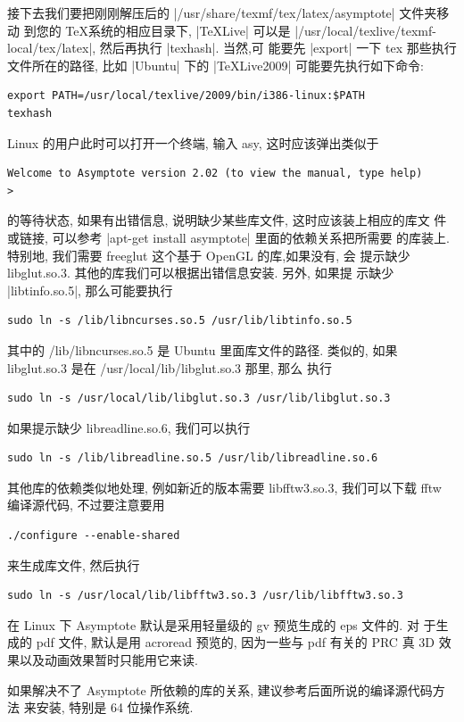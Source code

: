 \documentclass[nofonts,CJKnormalspaces]{ctexbook}[2009/05/20]
\begin{document}
接下去我们要把刚刚解压后的 |/usr/share/texmf/tex/latex/asymptote| 文件夹移动
到您的 \TeX 系统的相应目录下, |TeXLive| 可以是
|/usr/local/texlive/texmf-local/tex/latex|, 然后再执行 |texhash|. 当然,可
能要先 |export| 一下 tex 那些执行文件所在的路径, 比如 |Ubuntu| 下的
|TeXLive2009| 可能要先执行如下命令:
\begin{verbatim}
export PATH=/usr/local/texlive/2009/bin/i386-linux:$PATH
texhash
\end{verbatim}
Linux 的用户此时可以打开一个终端, 输入 asy, 这时应该弹出类似于
\begin{verbatim}
Welcome to Asymptote version 2.02 (to view the manual, type help)
>
\end{verbatim}
的等待状态, 如果有出错信息, 说明缺少某些库文件, 这时应该装上相应的库文
件或链接, 可以参考 |apt-get install asymptote| 里面的依赖关系把所需要
的库装上. 特别地, 我们需要 freeglut 这个基于 OpenGL 的库,如果没有, 会
提示缺少 libglut.so.3. 其他的库我们可以根据出错信息安装. 另外, 如果提
示缺少 |libtinfo.so.5|, 那么可能要执行
\begin{verbatim}
sudo ln -s /lib/libncurses.so.5 /usr/lib/libtinfo.so.5
\end{verbatim}
其中的 /lib/libncurses.so.5 是 Ubuntu 里面库文件的路径.
类似的, 如果 libglut.so.3 是在 /usr/local/lib/libglut.so.3 那里, 那么
执行
\begin{verbatim}
sudo ln -s /usr/local/lib/libglut.so.3 /usr/lib/libglut.so.3
\end{verbatim}
如果提示缺少 libreadline.so.6, 我们可以执行
\begin{verbatim}
sudo ln -s /lib/libreadline.so.5 /usr/lib/libreadline.so.6
\end{verbatim}
其他库的依赖类似地处理, 例如新近的版本需要 libfftw3.so.3, 我们可以下载
fftw 编译源代码, 不过要注意要用
\begin{verbatim}
./configure --enable-shared
\end{verbatim}
来生成库文件, 然后执行
\begin{verbatim}
sudo ln -s /usr/local/lib/libfftw3.so.3 /usr/lib/libfftw3.so.3
\end{verbatim}

在 Linux 下 Asymptote 默认是采用轻量级的 gv 预览生成的 eps 文件的. 对
于生成的 pdf 文件, 默认是用 acroread 预览的, 因为一些与 pdf 有关的 PRC
真 3D 效果以及动画效果暂时只能用它来读.

如果解决不了 Asymptote 所依赖的库的关系, 建议参考后面所说的编译源代码方法
来安装, 特别是 64 位操作系统.
\end{document}
